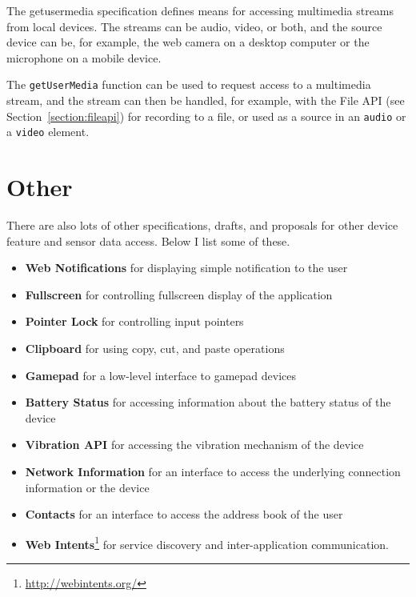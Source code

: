 The getusermedia specification \cite{getusermedia} defines means for
accessing multimedia streams from local devices. The streams can be
audio, video, or both, and the source device can be, for example, the
web camera on a desktop computer or the microphone on a mobile device.

The \texttt{getUserMedia} function can be used to request access to a
multimedia stream, and the stream can then be handled, for example,
with the File API (see Section~\ref{section:fileapi}) for recording to
a file, or used as a source in an \texttt{audio} or a \texttt{video}
element.

\section{Other}

There are also lots of other specifications, drafts, and proposals for
other device feature and sensor data access. Below I list some of
these.

\begin{itemize}

\item \textbf{Web Notifications} \cite{WebNotifications} for
  displaying simple notification to the user

\item \textbf{Fullscreen} \cite{Fullscreen} for controlling fullscreen
  display of the application

\item \textbf{Pointer Lock} \cite{PointerLock} for controlling input
  pointers

\item \textbf{Clipboard} \cite{ClipboardAPI} for using copy, cut, and
  paste operations

\item \textbf{Gamepad} \cite{Gamepad} for a low-level interface to
  gamepad devices

\item \textbf{Battery Status} \cite{BatteryStatusAPI} for accessing
  information about the battery status of the device

\item \textbf{Vibration API} \cite{VibrationAPI} for accessing the
  vibration mechanism of the device

\item \textbf{Network Information} \cite{NetworkInformationAPI} for an
  interface to access the underlying connection information or the
  device

\item \textbf{Contacts} \cite{ContactsAPI} for an interface to access
  the address book of the user

\item \textbf{Web Intents}\footnote{\url{http://webintents.org/}} for
  service discovery and inter-application communication.

\end{itemize}
